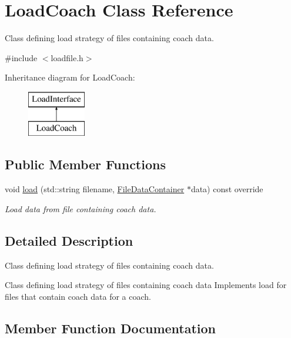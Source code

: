 \hypertarget{classLoadCoach}{}\section{Load\+Coach Class Reference}
\label{classLoadCoach}


Class defining load strategy of files containing coach data.  




{\ttfamily \#include $<$loadfile.\+h$>$}

Inheritance diagram for Load\+Coach\+:\begin{figure}[H]
\begin{center}
\leavevmode
\includegraphics[height=2.000000cm]{classLoadCoach}
\end{center}
\end{figure}
\subsection*{Public Member Functions}
\begin{DoxyCompactItemize}
\item 
void \mbox{\hyperlink{classLoadCoach_a53429bab741a1570b91f1650437b7af2}{load}} (std\+::string filename, \mbox{\hyperlink{classFileDataContainer}{File\+Data\+Container}} $\ast$data) const override
\begin{DoxyCompactList}\small\item\em Load data from file containing coach data. \end{DoxyCompactList}\end{DoxyCompactItemize}


\subsection{Detailed Description}
Class defining load strategy of files containing coach data. 

Class defining load strategy of files containing coach data Implements load for files that contain coach data for a coach. 

\subsection{Member Function Documentation}
\mbox{\label{classLoadCoach_a53429bab741a1570b91f1650437b7af2}} 
